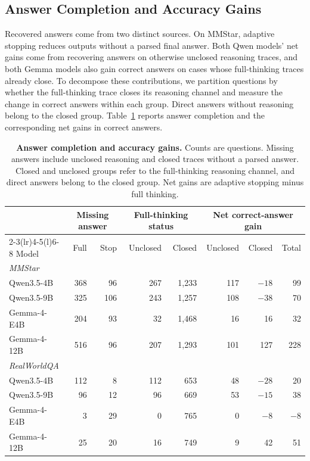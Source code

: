 \documentclass{article} %
\begin{document}
\subsection{Answer Completion and Accuracy Gains}
\label{app:completion_analysis}

Recovered answers come from two distinct sources. On MMStar, adaptive stopping reduces outputs without a parsed final answer. Both Qwen models' net gains come from recovering answers on otherwise unclosed reasoning traces, and both Gemma models also gain correct answers on cases whose full-thinking traces already close. To decompose these contributions, we partition questions by whether the full-thinking trace closes its reasoning channel and measure the change in correct answers within each group. Direct answers without reasoning belong to the closed group. Table~\ref{tab:completion_counts} reports answer completion and the corresponding net gains in correct answers.

\begin{table}[H]
\centering\small
\renewcommand{\arraystretch}{1.05}
\setlength{\tabcolsep}{2pt}
\caption{\textbf{Answer completion and accuracy gains.} Counts are questions. Missing answers include unclosed reasoning and closed traces without a parsed answer. Closed and unclosed groups refer to the full-thinking reasoning channel, and direct answers belong to the closed group. Net gains are adaptive stopping minus full thinking.}
\label{tab:completion_counts}
\begin{tabular*}{\textwidth}{@{\extracolsep{\fill}}lrrrrrrr@{}}
\toprule
& \multicolumn{2}{c}{Missing answer} & \multicolumn{2}{c}{Full-thinking status} & \multicolumn{3}{c}{Net correct-answer gain} \\
\cmidrule(lr){2-3}\cmidrule(lr){4-5}\cmidrule(l){6-8}
Model & Full & Stop & Unclosed & Closed & Unclosed & Closed & Total \\
\midrule
\multicolumn{8}{l}{\textit{MMStar}} \\
Qwen3.5-4B & 368 & 96 & 267 & 1,233 & 117 & $-18$ & 99 \\
Qwen3.5-9B & 325 & 106 & 243 & 1,257 & 108 & $-38$ & 70 \\
Gemma-4-E4B & 204 & 93 & 32 & 1,468 & 16 & 16 & 32 \\
Gemma-4-12B & 516 & 96 & 207 & 1,293 & 101 & 127 & 228 \\
\midrule
\multicolumn{8}{l}{\textit{RealWorldQA}} \\
Qwen3.5-4B & 112 & 8 & 112 & 653 & 48 & $-28$ & 20 \\
Qwen3.5-9B & 96 & 12 & 96 & 669 & 53 & $-15$ & 38 \\
Gemma-4-E4B & 3 & 29 & 0 & 765 & 0 & $-8$ & $-8$ \\
Gemma-4-12B & 25 & 20 & 16 & 749 & 9 & 42 & 51 \\
\bottomrule
\end{tabular*}
\end{table}
\end{document}
